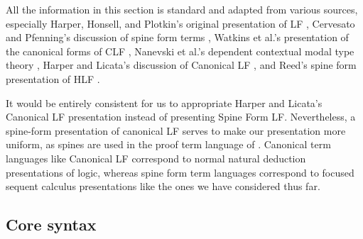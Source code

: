 All the information in this section is standard and adapted from
various sources, especially Harper, Honsell, and Plotkin's original
presentation of LF \cite{harper93framework}, Cervesato and Pfenning's
discussion of spine form terms \cite{cervesato02linear}, Watkins et
al.'s presentation of the canonical forms of CLF
\cite{watkins02concurrent}, Nanevski et al.'s dependent contextual
modal type theory \cite{nanevski08contextual}, Harper and Licata's
discussion of Canonical LF \cite{harper07mechanizing}, and Reed's
spine form presentation of HLF \cite{reed09hybrid}.

It would be entirely consistent for us to appropriate Harper and
Licata's Canonical LF presentation instead of presenting Spine Form
LF. Nevertheless, a spine-form presentation of canonical LF serves to
make our presentation more uniform, as spines are used in the proof
term language of \sls. Canonical term languages like Canonical LF
correspond to normal natural deduction presentations of logic, whereas
spine form term languages correspond to focused sequent calculus
presentations like the ones we have considered thus far.

\subsection{Core syntax}

